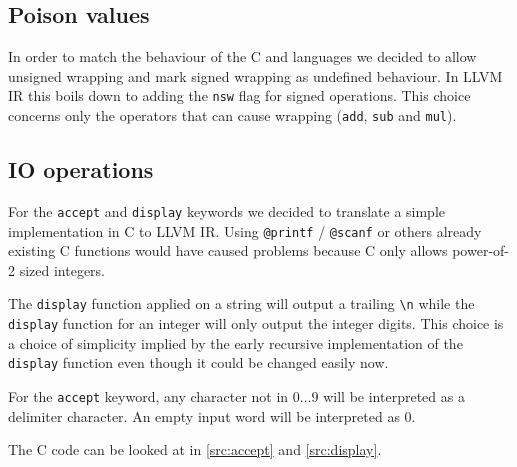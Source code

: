 \subsection{Poison values}

In order to match the behaviour of the C and \CXX languages we decided to allow unsigned wrapping and mark signed wrapping as undefined behaviour. In LLVM IR this boils down to adding the \verb!nsw! flag for signed operations.
This choice concerns only the operators that can cause wrapping (\verb!add!, \verb!sub! and \verb!mul!).

\subsection{IO operations}

For the \verb!accept! and \verb!display! keywords we decided to translate a simple implementation in C to LLVM IR. Using \verb!@printf! / \verb!@scanf! or others already existing C functions would have caused problems because C only allows power-of-2 sized integers.

The \verb!display! function applied on a string will output a trailing \verb!\n! while the \verb!display! function for an integer will only output the integer digits. This choice is a choice of simplicity implied by the early recursive implementation of the \verb!display! function even though it could be changed easily now.

For the \verb!accept! keyword, any character not in $0 \dots 9$ will be interpreted as a delimiter character. An empty input word will be interpreted as $0$.

The C code can be looked at in \ref{src:accept} and \ref{src:display}.





